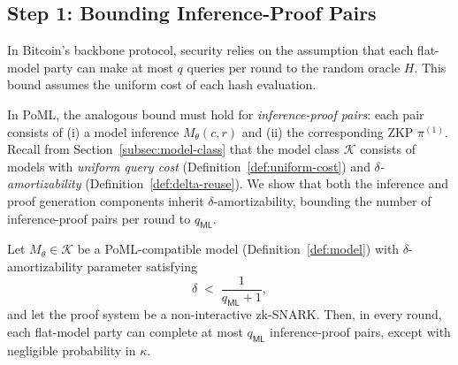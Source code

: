\subsection{Step 1: Bounding Inference-Proof Pairs}
\label{subsec:step0}

In Bitcoin's backbone protocol, security relies on the assumption that each flat-model party can make at most $q$ queries per round to the random oracle $H$. This bound assumes the uniform cost of each hash evaluation.

In PoML, the analogous bound must hold for \emph{inference-proof pairs}: each pair consists of (i) a model inference $M_\theta(c,r)$ and (ii) the corresponding ZKP $\pi^{(1)}$. Recall from Section~\ref{subsec:model-class} that the model class $\mathcal{K}$ consists of models with \emph{uniform query cost} (Definition~\ref{def:uniform-cost}) and \emph{$\delta$-amortizability} (Definition~\ref{def:delta-reuse}). We show that both the inference and proof generation components inherit $\delta$-amortizability, bounding the number of inference-proof pairs per round to $q_\mathsf{ML}$.

\begin{theorem}
\label{thm:amort-resist}
Let $M_\theta \in \mathcal{K}$ be a PoML-compatible model (Definition~\ref{def:model}) with $\delta$-amortizability parameter satisfying
\begin{equation}\label{eq:delta-bound}
    \delta \;<\; \frac{1}{q_{\mathsf{ML}} + 1},
\end{equation}
and let the proof system be a non-interactive zk-SNARK. Then, in every round, each flat-model party can complete at most $q_{\mathsf{ML}}$ inference-proof pairs, except with negligible probability in $\kappa$.
\end{theorem}

